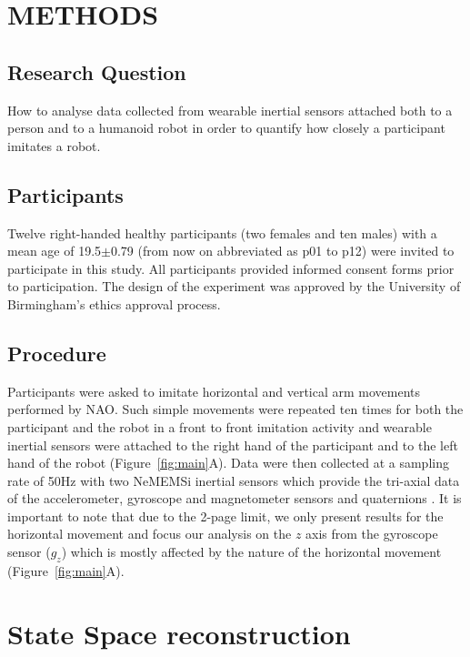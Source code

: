 \documentclass{sig-alternate-05-2015}
\begin{document}
\section{METHODS}

\subsection{Research Question}

How to analyse  data collected from wearable inertial sensors attached both 
to a person and to a humanoid robot in order to quantify how closely a participant 
imitates a robot.


\subsection{Participants}
Twelve right-handed healthy participants (two females and ten males)
with a mean age of 19.5$\pm$0.79 (from now on abbreviated as p01 to p12) were invited to 
participate in this study. 
All participants provided informed consent forms prior to participation.
The design of the experiment was approved by the University of Birmingham's ethics approval
process. 

 
\subsection{Procedure}
Participants were asked to imitate horizontal and vertical arm movements
performed by NAO.
Such simple movements were repeated ten times for both the participant and the robot
 in a front to front imitation activity
and
 wearable inertial sensors were attached to the right hand of the participant and to the left hand of the robot
(Figure~\ref{fig:main}A).
Data were then collected at a sampling rate of 50Hz with two NeMEMSi inertial sensors
which provide the tri-axial data of the accelerometer, gyroscope and magnetometer sensors and
quaternions \cite{Comotti2014}. 
It is important to note that due to the 2-page limit, we only present
results for the horizontal movement and focus our analysis on the $z$ axis from the gyroscope sensor ($g_z$) 
which is mostly affected by the nature of the horizontal movement (Figure~\ref{fig:main}A).


\section{State Space reconstruction}
\end{document}
